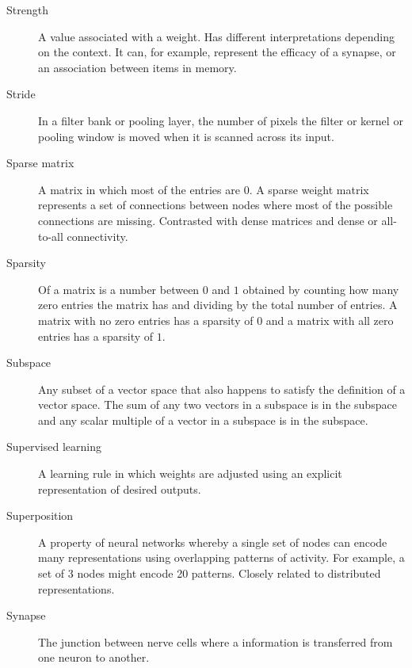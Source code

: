 \begin{description}

\item[Strength] A value associated with a weight. Has different interpretations depending on the context. It can, for example, represent the efficacy of a synapse, or an association between items in memory.

\item[Stride] In a filter bank or pooling layer, the number of pixels the filter or kernel or pooling window is moved when it is scanned across its input.


\item[Sparse matrix] A matrix in which most of the entries are 0. A sparse weight matrix represents a set of connections between nodes where most of the possible connections are missing. Contrasted with dense matrices and dense or all-to-all connectivity. 

\item[Sparsity] Of a matrix is a number between $0$ and $1$ obtained by counting how many zero entries the matrix has and dividing by the total number of entries. A matrix with no zero entries has a sparsity of $0$ and a matrix with all zero entries has a sparsity of $1$.

\item[Subspace] Any subset of a vector space that also happens to satisfy the definition of a vector space. The sum of any two vectors in a subspace is in the subspace and any scalar multiple of a vector in a subspace is in the subspace.

\item[Supervised learning] A learning rule in which weights are adjusted using an explicit representation of desired outputs.

\item[Superposition] A property of neural networks whereby a single set of nodes can encode many representations using overlapping patterns of activity.  For example, a set of 3 nodes might encode 20 patterns. Closely related to distributed representations. 


\item[Synapse] The junction between nerve cells where a information is transferred from one neuron to another.


\end{description}
